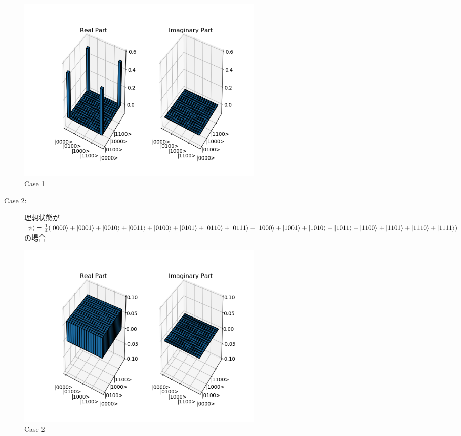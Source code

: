 \documentclass[11pt,a4j,notitlepage]{jreport}
\begin{document}
	\begin{figure}[htbp]
		\centering
			\includegraphics[clip,width=12.0cm]{./picture/1111ed.png}
			\caption{Case 1}
	\end{figure}
	
	\newpage

	\begin{description}
		\item[Case 2:] 理想状態が$\ket{\psi} = \frac{1}{4} (\ket{0000} + \ket{0001} + \ket{0010} + \ket{0011} + \ket{0100} + \ket{0101} + \ket{0110} + \ket{0111} + \ket{1000} + \ket{1001} + \ket{1010} + \ket{1011} + \ket{1100} + \ket{1101} + \ket{1110} + \ket{1111})$の場合 
	\end{description}
	
	\begin{figure}[htbp]
		\centering
			\includegraphics[clip,width=12.0cm]{./picture/all.png}
			\caption{Case 2}
	\end{figure}
\end{document}
